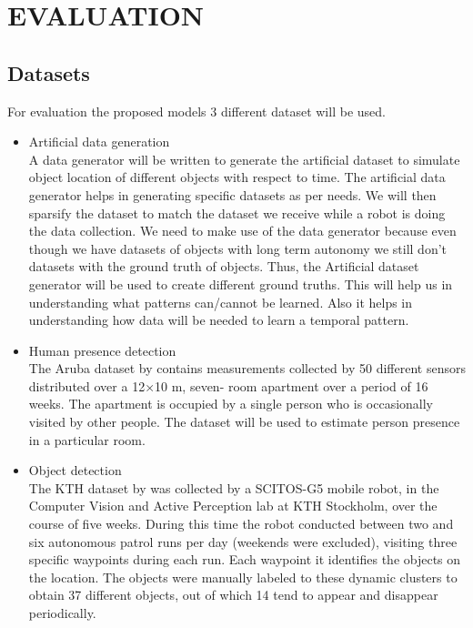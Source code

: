 \chapter{EVALUATION}

\section*{Datasets}

For evaluation the proposed models 3 different dataset will be used. 
\begin{itemize}
	\item Artificial data generation \\
	A data generator will be written to generate the artificial dataset to simulate object location of different objects with respect to time.
	The artificial data generator helps in generating specific datasets as per needs. We will then sparsify the dataset to match the dataset we receive while a robot is doing the data collection. We need to make use of the data generator because even though we have datasets of objects with long term autonomy we still don't datasets with the ground truth of objects. Thus, the Artificial dataset generator will be used to create different ground truths. This will help us in understanding what patterns can/cannot be learned. Also it helps in understanding how data will be needed to learn a temporal pattern.
	
	\item Human presence detection \\
	The Aruba dataset by \cite{cook2010learning} contains measurements collected by
50 different sensors distributed over a 12×10 m, seven-
room apartment over a period of 16 weeks. The apartment is
occupied by a single person who is occasionally visited by
other people. The dataset will be used to estimate person presence in a particular room.

	\item Object detection \\
	The KTH dataset by \cite {krajnik_life-long_2015} was collected
by a SCITOS-G5 mobile robot, in the Computer Vision and Active Perception lab at KTH Stockholm,
over the course of five weeks. During this time the robot
conducted between two and six autonomous patrol runs
per day (weekends were excluded), visiting three specific
waypoints during each run. Each waypoint it identifies the objects on the location. The objects were manually
labeled to these dynamic clusters to obtain 37 different objects,
out of which 14 tend to appear and disappear periodically.



\end{itemize}
